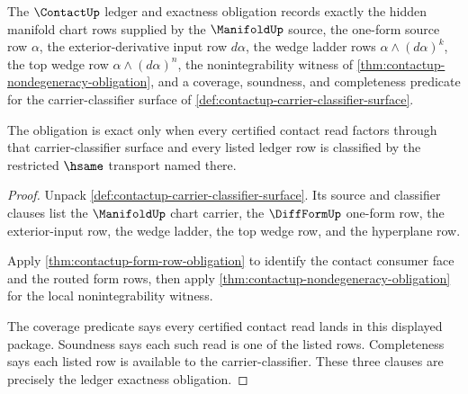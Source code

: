 \begin{theorem}
\label{thm:contactup-ledger-exactness-obligation}
The $\ContactUp$ ledger and exactness obligation records exactly the hidden manifold chart rows supplied by the $\ManifoldUp$ source, the one-form source row $\alpha$, the exterior-derivative input row $d\alpha$, the wedge ladder rows $\alpha\wedge(d\alpha)^k$, the top wedge row $\alpha\wedge(d\alpha)^n$, the nonintegrability witness of \autoref{thm:contactup-nondegeneracy-obligation}, and a coverage, soundness, and completeness predicate for the carrier-classifier surface of \autoref{def:contactup-carrier-classifier-surface}.

The obligation is exact only when every certified contact read factors through that carrier-classifier surface and every listed ledger row is classified by the restricted $\hsame$ transport named there.
\end{theorem}
\begin{proof}
Unpack \autoref{def:contactup-carrier-classifier-surface}. Its source and classifier clauses list the $\ManifoldUp$ chart carrier, the $\DiffFormUp$ one-form row, the exterior-input row, the wedge ladder, the top wedge row, and the hyperplane row.

Apply \autoref{thm:contactup-form-row-obligation} to identify the contact consumer face and the routed form rows, then apply \autoref{thm:contactup-nondegeneracy-obligation} for the local nonintegrability witness.

The coverage predicate says every certified contact read lands in this displayed package. Soundness says each such read is one of the listed rows. Completeness says each listed row is available to the carrier-classifier. These three clauses are precisely the ledger exactness obligation.
\end{proof}

